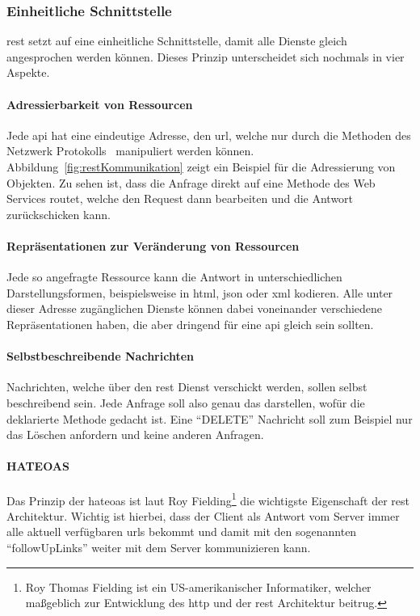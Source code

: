 	\subsubsection{Einheitliche Schnittstelle}
		\gls{rest} setzt auf eine einheitliche Schnittstelle,
		damit alle Dienste gleich angesprochen werden können.
		Dieses Prinzip unterscheidet sich nochmals in vier Aspekte.

		\paragraph{Adressierbarkeit von Ressourcen}
			Jede  \gls{api} hat eine eindeutige Adresse, den \gls{url},
			welche nur durch die Methoden des Netzwerk Protokolls~ manipuliert werden können.
			Abbildung~\ref{fig:restKommunikation} zeigt ein Beispiel für die Adressierung von Objekten.
			Zu sehen ist,
			dass die Anfrage direkt auf eine Methode des Web Services routet,
			welche den Request dann bearbeiten und die Antwort zurückschicken kann.

		\paragraph{Repräsentationen zur Veränderung von Ressourcen}
			Jede so angefragte Ressource kann die Antwort in unterschiedlichen Darstellungsformen,
			beispielsweise in \gls{html}, \gls{json} oder \gls{xml} kodieren.
			Alle unter dieser Adresse zugänglichen Dienste können dabei voneinander verschiedene Repräsentationen haben,
			die aber dringend für eine  \gls{api} gleich sein sollten.

		\paragraph{Selbstbeschreibende Nachrichten}
			Nachrichten, welche über den \gls{rest} Dienst verschickt werden, sollen selbst beschreibend sein.
			Jede Anfrage soll also genau das darstellen,
			wofür die deklarierte Methode gedacht ist.
			Eine \enquote{DELETE} Nachricht soll zum Beispiel nur das Löschen anfordern und keine anderen Anfragen.

		\paragraph{HATEOAS}\label{p:resthateoas}
			Das Prinzip der \gls{hateoas} ist laut
			Roy Fielding\footnote{Roy Thomas Fielding ist ein US-amerikanischer Informatiker,
	welcher maßgeblich zur Entwicklung des \gls{http} und der \gls{rest} Architektur beitrug.}
			die wichtigste Eigenschaft der \gls{rest} Architektur.
			Wichtig ist hierbei,
			dass der Client als Antwort vom Server immer alle aktuell verfügbaren \glspl{url} bekommt
			und damit mit den sogenannten \enquote{\glspl{followUpLink}} weiter mit dem Server kommunizieren kann.

